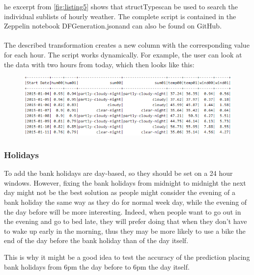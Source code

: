 he excerpt from \ref{fig:listing5} shows that \glqq structTypes\grqq can be used to search the individual sublists
of \glqq hourly weather\grqq .
The complete script is contained in the Zeppelin notebook \glqq DFGeneration.json\grqq and can also be found on GitHub.
\\\\
The described transformation creates a new column with the corresponding value for each hour.
The script works dynamically. For example, the user can look at the data with two hours from today,
which then looks like this:
\begin{figure}[H]
\hspace{-1.6cm}
\includegraphics[width=1.2\textwidth]{img/figure7_weather_df}\label{fig:figure7_weather_df}
\label{fig:figure7_weather_df}
\end{figure}
\subsubsection{Holidays}

To add the bank holidays are day-based, so they should be set on a 24 hour windows.
However, fixing the bank holidays from midnight to midnight the next day might not
be the best solution as people might consider the evening of a bank holiday the same
way as they do for normal week day, while the evening of the day before will be more
interesting. Indeed, when people want to go out in the evening and go to bed late,
they will prefer doing that when they don't have to wake up early in the morning,
thus they may be more likely to use a bike the end of the day before the bank
holiday than of the day itself.

This is why it might be a good idea to test the accuracy of the prediction
placing bank holidays from 6pm the day before to 6pm the day itself.


